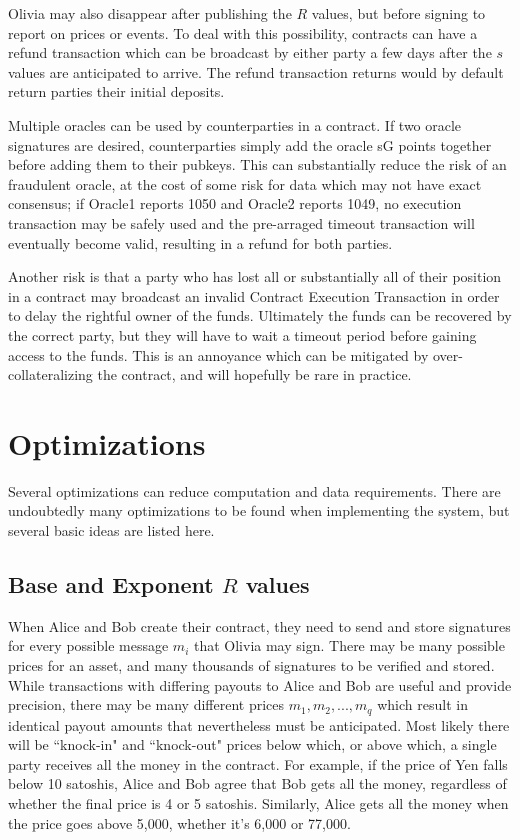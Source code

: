 \documentclass[10pt]{article}
\begin{document}
Olivia may also disappear after publishing the \(R\) values, but before signing to report on prices or events.  To deal with this possibility, contracts can have a refund transaction which can be broadcast by either party a few days after the \(s\) values are anticipated to arrive.  The refund transaction returns would by default return parties their initial deposits.


Multiple oracles can be used by counterparties in a contract.  If two oracle signatures are desired, counterparties simply add the oracle sG points together before adding them to their pubkeys.  This can substantially reduce the risk of an fraudulent oracle, at the cost of some risk for data which may not have exact consensus; if Oracle1 reports 1050 and Oracle2 reports 1049, no execution transaction may be safely used and the pre-arraged timeout transaction will eventually become valid, resulting in a refund for both parties.

Another risk is that a party who has lost all or substantially all of their position in a contract may broadcast an invalid Contract Execution Transaction in order to delay the rightful owner of the funds.  Ultimately the funds can be recovered by the correct party, but they will have to wait a timeout period before gaining access to the funds.  This is an annoyance which can be mitigated by over-collateralizing the contract, and will hopefully be rare in practice.

\section*{Optimizations}

Several optimizations can reduce computation and data requirements.  There are undoubtedly many optimizations to be found when implementing the system, but several basic ideas are listed here.

\subsection*{Base and Exponent \(R\) values}

When Alice and Bob create their contract, they need to send and store signatures for every possible message \(m_i\) that Olivia may sign.  There may be many possible prices for an asset, and many thousands of signatures to be verified and stored.  While transactions with differing payouts to Alice and Bob are useful and provide precision, there may be many different prices \(m_1,m_2,...,m_q\) which result in identical payout amounts that nevertheless must be anticipated.  Most likely there will be ``knock-in" and ``knock-out" prices below which, or above which, a single party receives all the money in the contract.  For example, if the price of Yen falls below 10 satoshis, Alice and Bob agree that Bob gets all the money, regardless of whether the final price is 4 or 5 satoshis.  Similarly, Alice gets all the money when the price goes above 5,000, whether it's 6,000 or 77,000.  
\end{document}
